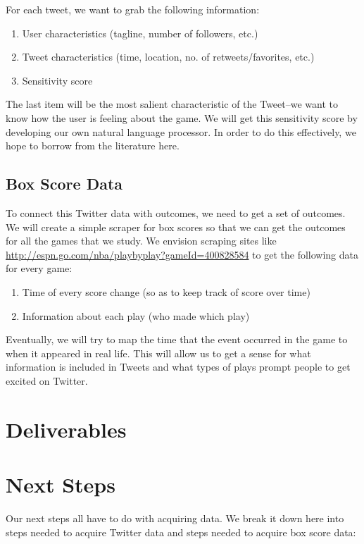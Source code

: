 \documentclass[12pt]{article}
\begin{document}
For each tweet, we want to grab the following information:
\begin{enumerate}
	\item User characteristics (tagline, number of followers, etc.)
	\item Tweet characteristics (time, location, no. of retweets/favorites, etc.)
	\item Sensitivity score
\end{enumerate}

\noindent
The last item will be the most salient characteristic of the Tweet--we want to know how the user is feeling about the game. We will get this sensitivity score by developing our own natural language processor. In order to do this effectively, we hope to borrow from the literature here.

\subsection{Box Score Data}

To connect this Twitter data with outcomes, we need to get a set of outcomes. We will create a simple scraper for box scores so that we can get the outcomes for all the games that we study. We envision scraping sites like \url{http://espn.go.com/nba/playbyplay?gameId=400828584} to get the following data for every game:
\begin{enumerate}
	\item Time of every score change (so as to keep track of score over time)
	\item Information about each play (who made which play)
\end{enumerate}

\noindent
Eventually, we will try to map the time that the event occurred in the game to when it appeared in real life. This will allow us to get a sense for what information is included in Tweets and what types of plays prompt people to get excited on Twitter.

\section{Deliverables}

\section{Next Steps}

Our next steps all have to do with acquiring data. We break it down here into steps needed to acquire Twitter data and steps needed to acquire box score data:
\end{document}
